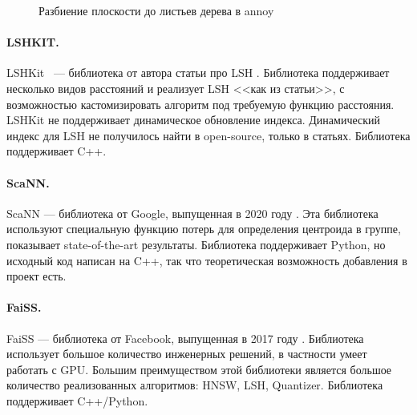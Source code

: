 \documentclass[a4paper,12pt]{extarticle}
\begin{document}
\begin{center}
\begin{figure}[H]
\caption{Разбиение плоскости до листьев дерева в annoy}
\label{ris:annoy_plane}
\end{figure}
\end{center}

\paragraph{LSHKIT.} LSHKit \cite{lshkit}~--- библиотека от автора статьи про LSH \cite{dong2008modeling}. Библиотека поддерживает несколько видов расстояний и реализует LSH <<как из статьи>>, с возможностью кастомизировать алгоритм под требуемую функцию расстояния. LSHKit не поддерживает динамическое обновление индекса. Динамический индекс для LSH не получилось найти в open-source, только в статьях. Библиотека поддерживает C++.

\paragraph{ScaNN.}

ScaNN \cite{Github:scann}--- библиотека от Google, выпущенная в 2020 году \cite{guo2020accelerating}. Эта библиотека используют специальную функцию потерь для определения центроида в группе, показывает state-of-the-art результаты. Библиотека поддерживает Python, но исходный код написан на C++, так что теоретическая возможность добавления в проект есть.

\paragraph{FaiSS.}
FaiSS \cite{Github:faiss}--- библиотека от Facebook, выпущенная в 2017 году \cite{johnson2019billion}. Библиотека использует большое количество инженерных решений, в частности умеет работать с GPU. Большим преимуществом этой библиотеки является большое количество реализованных алгоритмов: HNSW, LSH, Quantizer. Библиотека поддерживает C++/Python.
\end{document}
